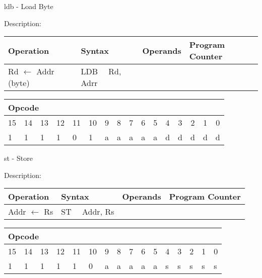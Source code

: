 \documentclass{article}
\begin{document}
\bigskip

ldb - Load Byte

Description:

\begin{tabular}{|l|l|l|l|}
\hline
Operation & Syntax & Operands & Program Counter \\ \hline
Rd $\leftarrow $ Addr (byte) & LDB \ \ Rd, Adrr &  &  \\ \hline
\end{tabular}

\begin{tabular}{|c|c|c|c|c|c|c|c|c|c|c|c|c|c|c|c|}
\hline
\multicolumn{6}{|l|}{Opcode} & \multicolumn{5}{|l|}{} & \multicolumn{5}{|l|}{
} \\ \hline
15 & 14 & 13 & 12 & 11 & 10 & 9 & 8 & 7 & 6 & 5 & 4 & 3 & 2 & 1 & 0 \\ \hline
\multicolumn{1}{|l|}{1} & \multicolumn{1}{|l|}{1} & \multicolumn{1}{|l|}{1}
& \multicolumn{1}{|l|}{1} & \multicolumn{1}{|l|}{0} & \multicolumn{1}{|l|}{1}
& \multicolumn{1}{|l|}{a} & \multicolumn{1}{|l|}{a} & \multicolumn{1}{|l|}{a}
& \multicolumn{1}{|l|}{a} & \multicolumn{1}{|l|}{a} & \multicolumn{1}{|l|}{d}
& \multicolumn{1}{|l|}{d} & \multicolumn{1}{|l|}{d} & \multicolumn{1}{|l|}{d}
& \multicolumn{1}{|l|}{d} \\ \hline
\end{tabular}

\bigskip

st - Store

Description:

\begin{tabular}{|l|l|l|l|}
\hline
Operation & Syntax & Operands & Program Counter \\ \hline
Addr $\leftarrow $ Rs & ST \ \ Addr, Rs &  &  \\ \hline
\end{tabular}

\begin{tabular}{|c|c|c|c|c|c|c|c|c|c|c|c|c|c|c|c|}
\hline
\multicolumn{6}{|l|}{Opcode} & \multicolumn{5}{|l|}{} & \multicolumn{5}{|l|}{
} \\ \hline
15 & 14 & 13 & 12 & 11 & 10 & 9 & 8 & 7 & 6 & 5 & 4 & 3 & 2 & 1 & 0 \\ \hline
\multicolumn{1}{|l|}{1} & \multicolumn{1}{|l|}{1} & \multicolumn{1}{|l|}{1}
& \multicolumn{1}{|l|}{1} & \multicolumn{1}{|l|}{1} & \multicolumn{1}{|l|}{0}
& \multicolumn{1}{|l|}{a} & \multicolumn{1}{|l|}{a} & \multicolumn{1}{|l|}{a}
& \multicolumn{1}{|l|}{a} & \multicolumn{1}{|l|}{a} & \multicolumn{1}{|l|}{s}
& \multicolumn{1}{|l|}{s} & \multicolumn{1}{|l|}{s} & \multicolumn{1}{|l|}{s}
& \multicolumn{1}{|l|}{s} \\ \hline
\end{tabular}
\end{document}
